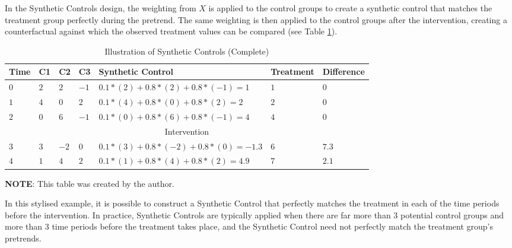 \documentclass[12pt]{article}
\begin{document}
In the Synthetic Controls design, the weighting from $X$ is applied to the control groups to create a synthetic control that matches the treatment group perfectly during the pretrend. The same weighting is then applied to the control groups after the intervention, creating a counterfactual against which the observed treatment values can be compared (see Table \ref{tab:SynthControlsComplete}).

\begin{table}
  \caption{Illustration of Synthetic Controls (Complete)}
  \begin{center}
      \begin{threeparttable}
        \small
        \begin{tabularx}{\textwidth}{|p{1cm}|p{0.8cm}|p{0.8cm}|p{0.8cm}|X|p{1.7cm}|p{1.7cm}|}
        \hline
        Time & C1 & C2 & C3 & Synthetic Control & Treatment & Difference \\
        \hline
        $0$ & $2$ & $2$  & $-1$ & $0.1*(2) + 0.8*(2) + 0.8*(-1) = 1$ & $1$ & $0$ \\
        \hline
        $1$ & $4$ & $0$  & $ 2$ & $0.1*(4) + 0.8*(0) + 0.8*( 2) = 2$ & $2$ & $0$ \\
        \hline
        $2$ & $0$ & $6$  & $-1$ & $0.1*(0) + 0.8*(6) + 0.8*(-1) = 4$ & $4$ & $0$ \\
        \hline
        \multicolumn{7}{|c|}{Intervention} \\
        \hline
        $3$ & $3$ & $-2$ & $ 0$ & $0.1*(3) + 0.8*(-2) + 0.8*(0) = -1.3 $ & $6$ & $7.3$ \\
        \hline
        $4$ & $1$ & $4$  & $ 2$ & $0.1*(1) + 0.8*( 4) + 0.8*(2) =  4.9 $ & $7$ & $2.1$ \\
        \hline
      \end{tabularx}
      \begin{tablenotes}
        \footnotesize
        \textbf{NOTE}: This table was created by the author.
      \end{tablenotes}
    \end{threeparttable}
  \end{center}
\label{tab:SynthControlsComplete}
\end{table}

In this stylised example, it is possible to construct a Synthetic Control that perfectly matches the treatment in each of the time periods before the intervention. In practice, Synthetic Controls are typically applied when there are far more than $3$ potential control groups and more than $3$ time periods before the treatment takes place, and the Synthetic Control need not perfectly match the treatment group's pretrends.
\end{document}

